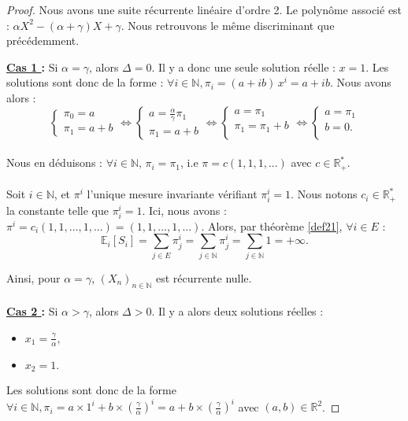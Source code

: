 \documentclass[12pt,a4paper]{report}
\theoremstyle{remark}
\begin{document}
\begin{proof}
Nous avons une suite récurrente linéaire d'ordre 2. Le polynôme associé est  : $\alpha X^2 -(\alpha+\gamma)X+\gamma$. Nous retrouvons le même discriminant que précédemment.

\vspace {0.5cm}
\textbf{\underline{Cas 1 } :} Si $\alpha = \gamma$, alors $\Delta = 0$. Il y a donc une seule solution réelle : $x =1.$
Les solutions sont donc de la forme : $\forall i \in \mathbb{N}, \pi_i = (a+ib) \, x^i = a+ib$. Nous avons alors : $$
\left\{
\begin{array}{ll}
        \pi_0 = a\\
        \pi_1 = a + b
    \end{array}
\right. 
\iff \left\{
\begin{array}{ll}
        a = \frac{\alpha}{\gamma}\pi_1\\
        \pi_1 = a + b
    \end{array}
    \right. 
\iff \left\{
\begin{array}{ll}
       a = \pi_1\\
       \pi_1 = \pi_1 + b\\
    \end{array}
    \right.
\iff \left\{
\begin{array}{ll}
       a = \pi_1\\
      b = 0 .\\
\end{array}
\right.
$$
\\
Nous en déduisons : $\forall i \in \mathbb{N}, \, \pi_i = \pi_1$, i.e $\pi = c (1,1,1,...)$ avec $c \in \mathbb{R}_+^*$.
\\
\\
Soit $i \in \mathbb{N}$, et $\pi^i$ l'unique mesure invariante vérifiant $\pi_i^i=1$. Nous notons $c_i\in \mathbb{R}_+^*$ la constante telle que $\pi_i^i=1$. Ici, nous avons : $\pi^i=c_i\left(1,1,...,1,...\right)=\left(1,1,...,1,...\right)$.
Alors, par théorème \ref{def21}, $\forall i \in E$ :
$$\mathbb{E}_i[S_i]=\sum\limits_{j\in E }\pi_j^i = \sum\limits_{j\in\mathbb{N} }\pi_j^i = \sum\limits_{j\in\mathbb{N} }1 = +\infty.$$

Ainsi, pour $\alpha=\gamma$, $(X_n)_{n\in\mathbb{N}}$ est récurrente nulle.
\\
\\
\textbf{\underline{Cas 2 } :} Si $\alpha > \gamma$, alors $\Delta > 0$. Il y a alors deux solutions réelles : 
\\
\begin{itemize}
\item $x_1= \frac{\gamma}{\alpha},$
\item $x_2=1.$
\end{itemize}
\vspace{0.5cm}
Les solutions sont donc de la forme $\forall i \in \mathbb {N}, \pi_i = a \times 1^i + b \times (\frac{\gamma}{\alpha})^i = a+b\times (\frac{\gamma}{\alpha})^i$ avec $ (a,b) \in \mathbb{R}^2$.


\end{proof}
\end{document}
